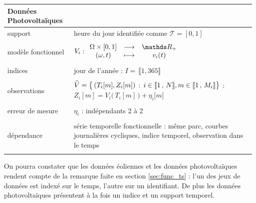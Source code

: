 \noalign\begin{tabularx}{\textwidth}{XX}
	\toprule
	\textbf{Données Photovoltaïques}                                                                                                                                                                       \\
	\midrule
	support            & heure du jour identifiée comme $\mathcal T = [0,1]$                                                                                                                               \\
	\\
	modèle fonctionnel & ${V}_i : \func {\Omega \times [0,1]} {\mathds R_+} {(\omega, t)} {v_i(t)}$                                                                                                        \\
	\\
	indices            & jour de l'année : $I = \, \llbracket 1, 365 \rrbracket$                                                                                                                           \\
	\\
	observations       & $\widehat V = \bigl\{ \, (T_i[m], Z_i[m]) \, : \, i \in \llbracket 1 \, , \, N \rrbracket, m \in \llbracket 1 \, , \, M_i \rrbracket \bigr\}$ : $Z_i[m] = V_i\bigl( \, T_i[m] \, \bigr) + \eta_i\bigl[ m \bigr]$ \\
	\\
	erreur de mesure   & $\eta_i$ : indépendants 2 à 2                                                                                                                                                     \\
	\\
	dépendance         & série temporelle fonctionnelle : même parc, courbes journalières cycliques, indice temporel, observation dans le temps                                                                               \\
	\\
	\bottomrule
\end{tabularx}

\bigskip

\begin{rem}
	On pourra constater que les données éoliennes et les données photovoltaïques rendent compte de la remarque faite en section \ref{sec:func_ts} : l'un des jeux de données est indexé sur le temps, l'autre sur un identifiant. De plus les données photovoltaïques présentent à la fois un indice et un support temporel.
\end{rem}


